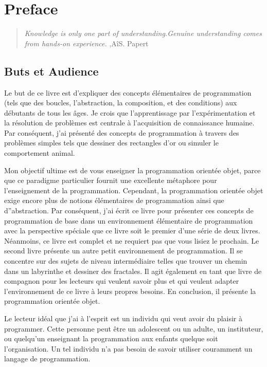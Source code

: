 \documentclass[a4paper,10pt,twoside]{book}
\begin{document}
    \sloppy
\fi

\chapter{Preface}\label{cha:preface}

\begin{quote}
\textit{Knowledge is only one part of understanding.Genuine understanding comes 
from hands-on experience.}
,A\^iS. Papert
\end{quote}


\section*{Buts et Audience}
Le but de ce livre est d'expliquer des concepts \'el\'ementaires de programmation (tels que des boucles, l'abstraction, la composition, et des conditions) aux d\'ebutants de tous les \^ages. Je crois que l'apprentissage par l'exp\'erimentation et la r\'esolution de probl\`emes est centrale \`a l'acquisition de connaissance humaine. Par cons\'equent, j'ai pr\'esent\'e des concepts de programmation \`a travers des probl\`emes simples tels que dessiner des rectangles d'or ou simuler le comportement animal.

Mon objectif ultime est de vous enseigner la programmation orient\'ee objet, parce que ce paradigme particulier fournit une excellente m\'etaphore pour l'enseignement de la programmation. Cependant, la programmation orient\'ee objet exige encore plus de notions \'el\'ementaires de programmation ainsi que d''abstraction. Par cons\'equent, j'ai \'ecrit ce livre pour pr\'esenter ces concepts de programmation de base dans un environnement \'el\'ementaire de programmation avec la perspective sp\'eciale que ce livre soit le premier d'une s\'erie de deux livres. N\'eanmoins, ce livre est complet et ne requiert pas que vous lisiez le prochain. Le second  livre pr\'esente un autre petit environnement de programmation. Il se concentre sur des sujets de niveau interm\'ediaire telles que trouver un chemin dans un labyrinthe et dessiner des fractales. Il agit \'egalement en tant que livre de compagnon pour les lecteurs qui veulent savoir plus et qui veulent adapter l'environnement de ce livre \`a leurs propres besoins. En conclusion, il pr\'esente la programmation orient\'ee objet.

Le lecteur id\'eal que j'ai \`a l'esprit est un individu qui veut avoir du plaisir \`a programmer. Cette personne peut \^etre un adolescent ou un adulte, un instituteur, ou quelqu'un enseignant la programmation aux enfants quelque soit l'organisation. Un tel individu n'a pas besoin de savoir utiliser couramment un langage de programmation. 
\end{document}

